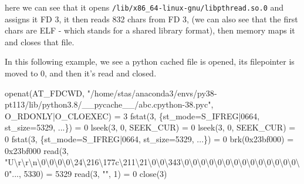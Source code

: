 \documentclass[
]{report}
\newenvironment{Shaded}{\begin{snugshade}}{\end{snugshade}}
\newcommand{\BuiltInTok}[1]{\textcolor[rgb]{0.00,0.23,0.31}{#1}}
\newcommand{\ErrorTok}[1]{\textcolor[rgb]{0.68,0.00,0.00}{#1}}
\newcommand{\ExtensionTok}[1]{\textcolor[rgb]{0.00,0.23,0.31}{#1}}
\newcommand{\KeywordTok}[1]{\textcolor[rgb]{0.00,0.23,0.31}{#1}}
\newcommand{\NormalTok}[1]{\textcolor[rgb]{0.00,0.23,0.31}{#1}}
\newcommand{\StringTok}[1]{\textcolor[rgb]{0.13,0.47,0.30}{#1}}
\begin{document}
here we can see that it opens
\texttt{/lib/x86\_64-linux-gnu/libpthread.so.0} and assigns it FD 3, it
then reads 832 chars from FD 3, (we can also see that the first chars
are ELF - which stands for a shared library format), then memory maps it
and closes that file.

In this following example, we see a python cached file is opened, its
filepointer is moved to 0, and then it's read and closed.

\begin{Shaded}
\begin{Highlighting}[]
\ExtensionTok{openat}\ErrorTok{(}\ExtensionTok{AT\_FDCWD,} \StringTok{"/home/stas/anaconda3/envs/py38{-}pt113/lib/python3.8/\_\_pycache\_\_/abc.cpython{-}38.pyc"}\NormalTok{, O\_RDONLY}\KeywordTok{|}\ExtensionTok{O\_CLOEXEC}\KeywordTok{)} \ExtensionTok{=}\NormalTok{ 3}
\ExtensionTok{fstat}\ErrorTok{(}\ExtensionTok{3,}\NormalTok{ \{st\_mode=S\_IFREG}\KeywordTok{|}\ExtensionTok{0664,}\NormalTok{ st\_size=5329, ...\}}\KeywordTok{)} \ExtensionTok{=}\NormalTok{ 0}
\ExtensionTok{lseek}\ErrorTok{(}\ExtensionTok{3,}\NormalTok{ 0, SEEK\_CUR}\KeywordTok{)}                   \ExtensionTok{=}\NormalTok{ 0}
\ExtensionTok{lseek}\ErrorTok{(}\ExtensionTok{3,}\NormalTok{ 0, SEEK\_CUR}\KeywordTok{)}                   \ExtensionTok{=}\NormalTok{ 0}
\ExtensionTok{fstat}\ErrorTok{(}\ExtensionTok{3,}\NormalTok{ \{st\_mode=S\_IFREG}\KeywordTok{|}\ExtensionTok{0664,}\NormalTok{ st\_size=5329, ...\}}\KeywordTok{)} \ExtensionTok{=}\NormalTok{ 0}
\ExtensionTok{brk}\ErrorTok{(}\ExtensionTok{0x23bf000}\KeywordTok{)}                          \ExtensionTok{=}\NormalTok{ 0x23bf000}
\BuiltInTok{read}\ErrorTok{(}\ExtensionTok{3,} \StringTok{"U\textbackslash{}r\textbackslash{}r\textbackslash{}n\textbackslash{}0\textbackslash{}0\textbackslash{}0\textbackslash{}0\textbackslash{}24\textbackslash{}216\textbackslash{}177c\textbackslash{}211\textbackslash{}21\textbackslash{}0\textbackslash{}0\textbackslash{}343\textbackslash{}0\textbackslash{}0\textbackslash{}0\textbackslash{}0\textbackslash{}0\textbackslash{}0\textbackslash{}0\textbackslash{}0\textbackslash{}0\textbackslash{}0\textbackslash{}0\textbackslash{}0\textbackslash{}0\textbackslash{}0\textbackslash{}0"}\NormalTok{..., 5330}\KeywordTok{)} \ExtensionTok{=}\NormalTok{ 5329}
\BuiltInTok{read}\ErrorTok{(}\ExtensionTok{3,} \StringTok{""}\NormalTok{, 1}\KeywordTok{)}                          \ExtensionTok{=}\NormalTok{ 0}
\ExtensionTok{close}\ErrorTok{(}\ExtensionTok{3}\KeywordTok{)}
\end{Highlighting}
\end{Shaded}
\end{document}
